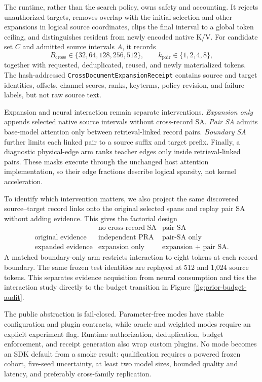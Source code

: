 \documentclass[11pt]{article}
\begin{document}
The runtime, rather than the search policy, owns safety and accounting. It
rejects unauthorized targets, removes overlap with the initial selection and
other expansions in logical source coordinates, clips the final interval to a
global token ceiling, and distinguishes resident from newly encoded native K/V.
For candidate set $C$ and admitted source intervals $A$, it records
\[
B_{\mathrm{cross}}\in\{32,64,128,256,512\},\qquad
k_{\mathrm{pair}}\in\{1,2,4,8\},
\]
together with requested, deduplicated, reused, and newly materialized tokens.
The hash-addressed \texttt{CrossDocumentExpansionReceipt} contains source and
target identities, offsets, channel scores, ranks, keyterms, policy revision,
and failure labels, but not raw source text.

Expansion and neural interaction remain separate interventions. \emph{Expansion
only} appends selected native source intervals without cross-record SA.
\emph{Pair SA} admits base-model attention only between retrieval-linked record
pairs. \emph{Boundary SA} further limits each linked pair to a source suffix and
target prefix. Finally, a diagnostic physical-edge arm ranks teacher edges only
inside retrieval-linked pairs. These masks execute through the unchanged host
attention implementation, so their edge fractions describe logical sparsity,
not kernel acceleration.

To identify which intervention matters, we also project the same discovered
source--target record links onto the original selected spans and replay pair SA
without adding evidence. This gives the factorial design
\[
\begin{array}{c|cc}
 & \text{no cross-record SA} & \text{pair SA} \\
\hline
\text{original evidence} & \text{independent PRA} & \text{pair-SA only} \\
\text{expanded evidence} & \text{expansion only} & \text{expansion + pair SA}.
\end{array}
\]
A matched boundary-only arm restricts interaction to eight tokens at each record
boundary. The same frozen test identities are replayed at 512 and 1,024 source
tokens. This separates evidence acquisition from neural consumption and ties the
interaction study directly to the budget transition in
Figure~\ref{fig:prior-budget-audit}.

The public abstraction is fail-closed. Parameter-free modes have stable
configuration and plugin contracts, while oracle and weighted modes require an
explicit experiment flag. Runtime authorization, deduplication, budget
enforcement, and receipt generation also wrap custom plugins. No mode becomes
an SDK default from a smoke result: qualification requires a powered frozen
cohort, five-seed uncertainty, at least two model sizes, bounded quality and
latency, and preferably cross-family replication.
\end{document}
